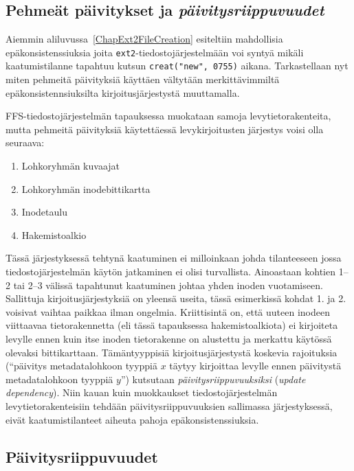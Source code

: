 \subsection{Pehmeät päivitykset ja \emph{päivitysriippuvuudet}}
Aiemmin aliluvussa~\ref{ChapExt2FileCreation} esiteltiin mahdollisia epäkonsistenssiuksia joita \texttt{ext2}-tiedostojärjestelmään voi syntyä mikäli kaatumistilanne tapahtuu kutsun \texttt{creat("new", 0755)} aikana.
Tarkastellaan nyt miten pehmeitä päivityksiä käyttäen vältytään merkittävimmiltä epäkonsistennsiuksilta kirjoitusjärjestystä muuttamalla.

FFS-tiedostojärjestelmän tapauksessa muokataan samoja levytietorakenteita,
mutta pehmeitä päivityksiä käytettäessä levykirjoitusten järjestys voisi olla seuraava:
\begin{enumerate}
    \item{Lohkoryhmän kuvaajat}
    \item{Lohkoryhmän inodebittikartta}
    \item{Inodetaulu}
    \item{Hakemistoalkio}
\end{enumerate}
%
Tässä järjestyksessä tehtynä kaatuminen ei milloinkaan johda tilanteeseen jossa tiedostojärjestelmän käytön jatkaminen ei olisi turvallista.
Ainoastaan kohtien 1--2 tai 2--3 välissä tapahtunut kaatuminen johtaa yhden inoden vuotamiseen.
Sallittuja kirjoitusjärjestyksiä on yleensä useita, tässä esimerkissä kohdat 1. ja 2. voisivat vaihtaa paikkaa ilman ongelmia.
Kriittisintä on, että uuteen inodeen viittaavaa tietorakennetta (eli tässä tapauksessa hakemistoalkiota) ei kirjoiteta levylle ennen kuin itse inoden tietorakenne on alustettu ja merkattu käytössä olevaksi bittikarttaan.
Tämäntyyppisiä kirjoitusjärjestystä koskevia rajoituksia (``päivitys metadatalohkoon tyyppiä $x$ täytyy kirjoittaa levylle ennen päivitystä metadatalohkoon tyyppiä $y$'') kutsutaan \emph{päivitysriippuvuuksiksi} (\emph{update dependency}).
Niin kauan kuin muokkaukset tiedostojärjestelmän levytietorakenteisiin tehdään päivitysriippuvuuksien sallimassa järjestyksessä,
eivät kaatumistilanteet aiheuta pahoja epäkonsistenssiuksia.

\subsection{Päivitysriippuvuudet}

